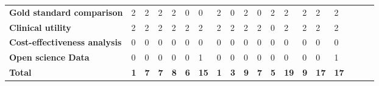 \begin{landscape}
\begin{table}[!htp]
\begin{tabular}{p{3.8cm}|p{1cm}p{1cm}p{1cm}p{1cm}p{1cm}p{1cm}p{1cm}p{1cm}p{1cm}p{1cm}p{1cm}p{1cm}p{1cm}p{1cm}p{1cm}p{1cm}p{1cm}p{1cm}}
\textbf{Gold standard comparison} &2 &2 &2 &2 &0 &0 &2 &0 &2 &0 &2 &2 &2 &2 &2 \\
\textbf{Clinical utility} &2 &2 &2 &2 &2 &2 &2 &2 &2 &2 &0 &2 &2 &2 &2 \\
\textbf{Cost-effectiveness analysis} &0 &0 &0 &0 &0 &0 &0 &0 &0 &0 &0 &0 &0 &0 &0 \\
\textbf{Open science Data} &0 &0 &0 &0 &0 &1 &0 &0 &0 &0 &0 &0 &0 &0 &1 \\
\bottomrule
\textbf{Total} &\textbf{1} &\textbf{7} &\textbf{7} &\textbf{8} &\textbf{6} &\textbf{15} &\textbf{1} &\textbf{3} &\textbf{9} &\textbf{7} &\textbf{5} &\textbf{19} &\textbf{9} &\textbf{17} &\textbf{17} \\
\bottomrule
\end{tabular}
\end{table}
\vfill
\end{landscape}
\renewcommand{\arraystretch}{5}
